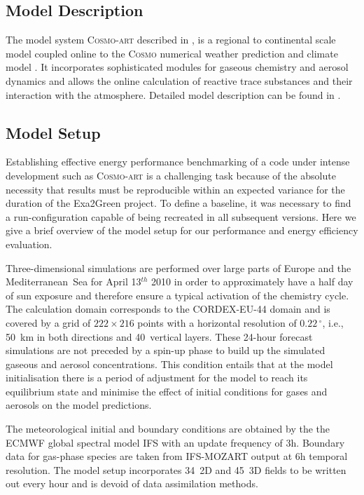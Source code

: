\subsection{Model Description}
\label{subsec:1.1}

The model  system \textsc{Cosmo-art} described  in \citep{Vogel-2009},
is  a  regional to  continental  scale  model  coupled online  to  the
\textsc{Cosmo}   numerical  weather   prediction  and   climate  model
\citep{Baldauf-2011}.   It   incorporates  sophisticated  modules  for
gaseous  chemistry   and  aerosol  dynamics  and   allows  the  online
calculation of  reactive trace  substances and their  interaction with
the  atmosphere.    Detailed  model   description  can  be   found  in
\citep{Bangert-2012, Knote-2011, Knote-2013}.

\subsection{Model Setup}
\label{subsec:1.2}

Establishing effective energy performance benchmarking of a code under
intense development  such as \textsc{Cosmo-art} is  a challenging task
because of  the absolute necessity  that results must  be reproducible
within  an  expected  variance  for  the  duration  of  the  Exa2Green
pro\-je\-ct.  To   define  a  baseline,   it  was  necessary  to   find  a
run-configuration  capable  of   being  recreated  in  all  subsequent
versions.  Here  we give a brief  overview of the model  setup for our
performance and energy efficiency evaluation.

Three-dimensional simulations are performed over large parts of Europe
and the Mediterranean~Sea for April 13$^{th}$ 2010 in order to approximately
have a half  day  of  sun  exposure and  therefore  ensure  a typical
activation of the chemistry cycle.  The calculation domain corresponds
to the CORDEX-EU-44 domain and is covered by a grid of $222\times 216$
points with  a horizontal resolution of  $0.22\,^{\circ}$, i.e., 50~km
in  both directions  and 40~vertical  layers.  These  24-hour forecast
simulations  are not  preceded  by  a spin-up  phase  to build up  the
simulated gaseous and  aerosol concentrations.  This condition entails
that at the model initialisation there is a period of adjustment for
the model  to reach its equilibrium  state and minimise  the effect of
initial conditions for gases and aerosols on the model predictions.

The meteorological initial and boundary conditions are obtained by the
the ECMWF  global spectral model IFS  with an update  frequency of 3h.
Boundary data  for gas-phase species are taken  from IFS-MOZART output
at  6h temporal resolution.   The model  setup incorporates  34~2D and
45~3D  fields to  be written  out  every hour  and is  devoid of  data
assimilation methods.

